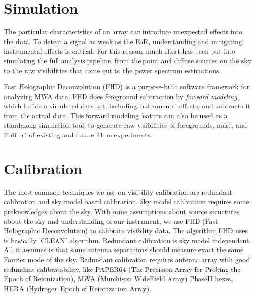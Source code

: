 \documentclass[a0,landscape]{a0poster}
\begin{document}
\begin{multicols}{4}

\section*{Simulation}

The particular characteristics of an array can introduce unexpected effects into the data. To detect a signal as weak as the EoR, understanding and mitigating instrumental effects is critical. For this reason, much effort has been put into simulating the full analysis pipeline, from the point and diffuse sources on the sky to the raw visibilities that come out to the power spectrum estimations.

Fast Holographic Deconvolution (FHD) is a purpose-built software framework for analyzing MWA data. FHD does foreground subtraction by \emph{forward modeling}, which builds a simulated data set, including instrumental effects, and subtracts it from the actual data. This forward modeling feature can also be used as a standalong simulation tool, to generate raw visibilities of foregrounds, noise, and EoR off of existing and future 21cm experiments.


\section*{Calibration}

The most common techniques we use on visibility calibration are redundant calibration and sky model based calibration. Sky model calibration requires some preknowledges about the sky. With some assumptions about source structures about the sky and understanding of our instrument, we use FHD (Fast Holographic Deconvolution) to calibrate visibility data. The algorithm FHD uses is basically 'CLEAN' algorithm. Redundant calibration is sky model independent. All it assumes is that same antenna separations should measure exact the same Fourier mode of the sky. Redundant calibration requires antenna array with good redundant calibratability, like PAPER64 (The Precision Array for Probing the Epoch of Reionization), MWA (Murchison WideField Array) PhaseII hexes, HERA (Hydrogen Epoch of Reionization Array).


\end{multicols}
\end{document}
